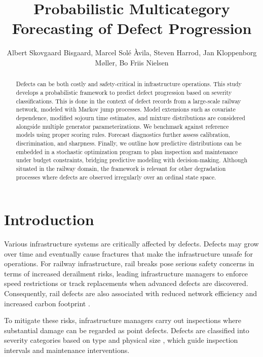 \documentclass{article}
\title{Probabilistic Multicategory Forecasting of Defect Progression}
\author{Albert Skovgaard Bisgaard, Marcel Solé Àvila, Steven Harrod, Jan Kloppenborg Møller, Bo Friis Nielsen}
\date{}
\begin{document}
\maketitle



\begin{abstract}
Defects can be both costly and safety-critical in infrastructure operations. 
This study develops a probabilistic framework to predict defect progression based on severity classifications.
This is done in the context of defect records from a large-scale railway network, modeled with Markov jump processes.
Model extensions such as covariate dependence, modified sojourn time estimates, and mixture distributions are considered alongside multiple generator parameterizations.
We benchmark against reference models using proper scoring rules. Forecast diagnostics further assess calibration, discrimination, and sharpness. 
Finally, we outline how predictive distributions can be embedded in a stochastic optimization program to plan inspection and maintenance under budget constraints, bridging predictive modeling with decision-making. Although situated in the railway domain, the framework is relevant for other degradation processes where defects are observed irregularly over an ordinal state space.
\end{abstract} 




\section{Introduction} \label{sec:introduction} Various infrastructure systems are critically affected by defects. Defects may grow over time and eventually cause fractures that make the infrastructure unsafe for operations.
For railway infrastructure, rail breaks pose serious safety concerns in terms of increased derailment risks, leading infrastructure managers to enforce speed restrictions or track replacements when advanced defects are discovered. 
Consequently, rail defects are also associated with reduced network efficiency and increased carbon footprint \citep{cannon2003a,Zoeteman2014DutchBeyond}.  

To mitigate these risks, infrastructure managers carry out inspections where substantial damage can be regarded as point defects. 
Defects are classified into severity categories based on type and physical size \citep{UIC_2002_defecthandbook}, which guide inspection intervals and maintenance interventions.  
\end{document}
